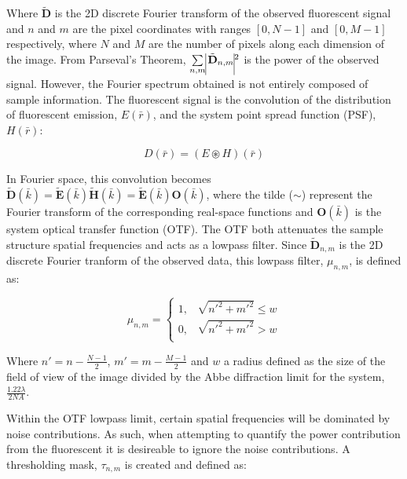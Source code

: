 	Where $\tilde{\textbf{D}}$ is the 2D discrete Fourier transform of 
	the observed fluorescent signal and $n$ and $m$ are the pixel coordinates 
	with ranges $[0, N-1]$ and $[0, M-1]$ respectively, where $N$ and $M$ are the
	number of pixels along each dimension of the image. From Parseval's Theorem, 
	$\sum\limits_{n,m}\vline \tilde{\textbf{D}}_{n,m} \vline^2$ is
	the power of the observed signal. However, the Fourier spectrum
	obtained is not entirely composed of sample information. The 
	fluorescent signal is the convolution of the distribution of fluorescent 
	emission, $E(\bar{r})$, and the system point spread function (PSF), 
	$H(\bar{r})$: 
	
	\begin{equation}\label{eq:fluor_signal_real}
		D(\bar{r}) = (E \circledast H)(\bar{r})
	\end{equation}
	
	In Fourier space, this convolution becomes $\tilde{\textbf{D}}(\bar{k}) 
	= \tilde{\textbf{E}}(\bar{k}) \tilde{\textbf{H}}(\bar{k}) = 
	\tilde{\textbf{E}}(\bar{k}) \textbf{O}(\bar{k})$, where the tilde ($\sim$)
	represent the Fourier transform of the corresponding real-space functions and 
	$\textbf{O}(\bar{k})$ is the system optical transfer function (OTF).\cite{gustafsson2008three} The OTF both attenuates the sample structure spatial frequencies and acts as
	a lowpass filter. Since $\tilde{\textbf{D}}_{n,m}$ is the 2D discrete
	Fourier tranform of the observed data, this lowpass filter, $\mu_{n,m}$, is
	defined as:
	
	\begin{equation}\label{eq:circular_mask}
	\mu_{n,m} = 
	\begin{cases}
	1, & \sqrt{n'^{2} + m'^{2}} \le w\\
	0, & \sqrt{n'^{2} + m'^{2}} > w\\ 
	\end{cases}
	\end{equation}
	
	Where $n' = n - \frac{N-1}{2}$, $m' = m - \frac{M-1}{2}$ and $w$ a radius 
	defined as the size of the field of view of the image divided by the Abbe
	diffraction limit for the system, $\frac{1.22\lambda}{2NA}$.\cite{abbe1873beitrage} 
	
	Within the OTF lowpass limit, certain spatial frequencies will be dominated
	by noise contributions. As such, when attempting to quantify the power 
	contribution from the fluorescent it is desireable to ignore the noise
	contributions. A thresholding mask, $\tau_{n,m}$ is created and defined as:
	
